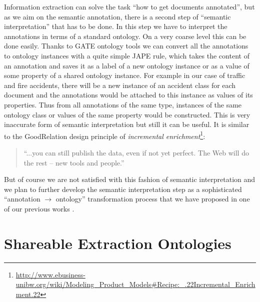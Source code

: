 Information extraction can solve the task ``how to get documents annotated'', but as we aim on the semantic annotation, there is a second step of ``semantic interpretation'' that has to be done. In this step we have to interpret the annotations in terms of a standard ontology. On a very coarse level this can be done easily. Thanks to GATE ontology tools \citep{Bon04b} we can convert all the annotations to ontology instances with a quite simple JAPE \citep{Cunningham00jape:a} rule, which takes the content of an annotation and saves it as a label of a new ontology instance or as a value of some property of a shared ontology instance. For example in our case of traffic and fire accidents, there will be a new instance of an accident class for each document and the annotations would be attached to this instance as values of its properties. Thus from all annotations of the same type, instances of the same ontology class or values of the same property would be constructed. This is very inaccurate form of semantic interpretation but still it can be useful. It is similar to the GoodRelation \citep{DBLP:conf/ekaw/Hepp08} design principle of \emph{incremental enrichment}\footnote{
\url{http://www.ebusiness-unibw.org/wiki/Modeling_Product_Models#Recipe:_.22Incremental_Enrichment.22}
}:
\begin{quote}
``...you can still publish the data, even if not yet perfect. The Web will do the rest -- new tools and people.''	
\end{quote}

But of course we are not satisfied with this fashion of semantic interpretation and we plan to further develop the semantic interpretation step as a sophisticated ``annotation $\rightarrow$ ontology'' transformation process that we have proposed in one of our previous works \citep{biblio:DeVoComputingaggregations2008}.






\section{Shareable Extraction Ontologies} \label{sec:methods_Shareable_Extraction_Ontologies} \label{sec:ch70_extraction_ontologies}
\graphicspath{{../img/ch70/}}


